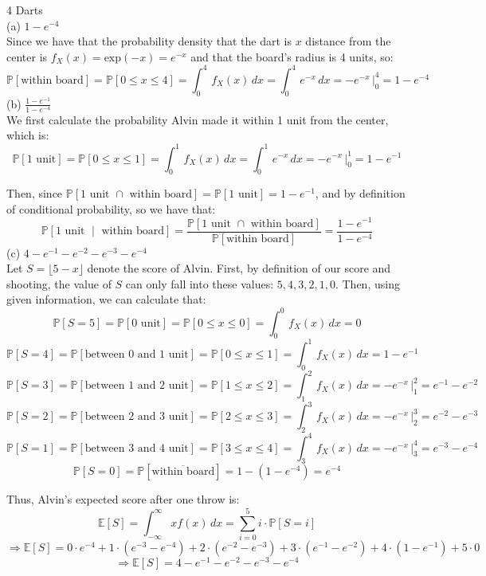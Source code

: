 \documentclass{article}
\begin{document}
{\Large 4 Darts} \\[.5cm]
{\color{red} (a) $1 - e^{-4}$} \\

Since we have that the probability density that the dart is $x$ distance from the center is $f_X(x) = \text{exp}(-x) = e^{-x}$ and that the board's radius is 4 units, so:
$$\mathbb{P}[\text{within board}] = 
\mathbb{P}[0\leq x\leq4] =
\int_{0}^{4}\, f_X(x)\,dx =
\int_{0}^{4}\, e^{-x}\,dx =
-e^{-x}\,\big|_0^4 = 1 - e^{-4}$$
{\color{red} (b) $\frac{1 - e^{-1}}{1 - e^{-4}}$} \\

We first calculate the probability Alvin made it within 1 unit from the center, which is:
$$\mathbb{P}[\text{1 unit}] = 
\mathbb{P}[0\leq x\leq1] =
\int_{0}^{1}\, f_X(x)\,dx =
\int_{0}^{1}\, e^{-x}\,dx =
-e^{-x}\,\big|_0^1 = 1 - e^{-1}$$

Then, since
$\mathbb{P}[\text{1 unit $\cap$ within board}] = \mathbb{P}[\text{1 unit}] = 1 - e^{-1}$, and by definition of conditional probability, so we have that:
$$\mathbb{P}[\text{1 unit $\mid$ within board}] =
\frac{\mathbb{P}[\text{1 unit $\cap$ within board}]}{\mathbb{P}[\text{within board}]} =
\frac{1 - e^{-1}}{1 - e^{-4}}$$
{\color{red} (c) $4 - e^{-1} - e^{-2} - e^{-3} - e^{-4}$} \\

Let $S = \lfloor5-x\rfloor$ denote the score of Alvin. First, by definition of our score and shooting, the value of $S$ can only fall into these values: $5, 4, 3, 2, 1, 0$. Then, using given information, we can calculate that:
$$\mathbb{P}[S=5] = \mathbb{P}[\text{0 unit}]
= \mathbb{P}[0\leq x\leq0] = \int_{0}^{0}\, f_X(x)\,dx = 0$$
$$\mathbb{P}[S=4] = \mathbb{P}[\text{between 0 and 1 unit}] = \mathbb{P}[0\leq x\leq1] = \int_{0}^{1}\, f_X(x)\,dx = 1 - e^{-1}$$
$$\mathbb{P}[S=3] = \mathbb{P}[\text{between 1 and 2 unit}] = \mathbb{P}[1\leq x\leq2] = \int_{1}^{2}\, f_X(x)\,dx =
-e^{-x}\,\big|_1^2 = e^{-1} - e^{-2}$$
$$\mathbb{P}[S=2] = \mathbb{P}[\text{between 2 and 3 unit}] = \mathbb{P}[2\leq x\leq3] = \int_{2}^{3}\, f_X(x)\,dx =
-e^{-x}\,\big|_2^3 = e^{-2} - e^{-3}$$
$$\mathbb{P}[S=1] = \mathbb{P}[\text{between 3 and 4 unit}] = \mathbb{P}[3\leq x\leq4] = \int_{3}^{4}\, f_X(x)\,dx =
-e^{-x}\,\big|_3^4 = e^{-3} - e^{-4}$$
$$\mathbb{P}[S=0] = \mathbb{P}[\overline{\text{within board}}] =
1 - (1 - e^{-4}) = e^{-4}$$

Thus, Alvin’s expected score after one throw is:
$$\mathbb{E}[S] = \int_{-\infty}^\infty xf(x)\,dx =
\sum\limits_{i=0}^5 i\cdot\mathbb{P}[S=i]$$
$$\Longrightarrow \mathbb{E}[S] =
0\cdot e^{-4} + 1\cdot(e^{-3} - e^{-4}) +
2\cdot (e^{-2} - e^{-3}) + 3\cdot (e^{-1} - e^{-2}) + 
4\cdot (1 - e^{-1}) + 5\cdot 0$$
$$\Longrightarrow \mathbb{E}[S] =
4 - e^{-1} - e^{-2} - e^{-3} - e^{-4}$$
\end{document}
